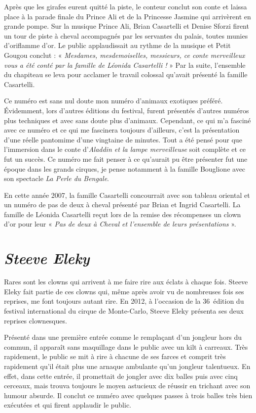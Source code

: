 Après que les girafes eurent quitté la piste, le conteur conclut son conte et laissa place à la parade finale du Prince Ali et de la Princesse Jasmine qui arrivèrent en grande pompe. Sur la musique Prince Ali, Brian Casartelli et Denise Sforzi firent un tour de piste à cheval accompagnés par les servantes du palais, toutes munies d’oriflamme d’or. Le public applaudissait au rythme de la musique et Petit Gougou conclut : « \textit{Mesdames, mesdemoiselles, messieurs, ce conte merveilleux vous a été conté par la famille de Léonida Casartelli ! }» Par la suite, l’ensemble du chapiteau se leva pour acclamer le travail colossal qu'avait présenté la famille Casartelli. 

Ce numéro est sans nul doute mon numéro d’animaux exotiques préféré. Évidemment, lors d’autres éditions du festival, furent présentés d’autres numéros plus techniques et avec sans doute plus d’animaux. Cependant, ce qui m’a fasciné avec ce numéro et ce qui me fascinera toujours d’ailleurs, c'est la présentation d’une réelle pantomime d’une vingtaine de minutes. Tout a été pensé pour que l'immersion dans le conte d’\textit{Aladdin et la lampe merveilleuse} soit complète et ce fut un succès. Ce numéro me fait penser à ce qu’aurait pu être présenter fut une époque dans les grands cirques, je pense notamment à la famille Bouglione avec son spectacle \textit{La Perle du Bengale}. 

En cette année 2007, la famille Casartelli concourrait avec son tableau oriental et un numéro de pas de deux à cheval présenté par Brian et Ingrid Casartelli. La famille de Léonida Casartelli reçut lors de la remise des récompenses un clown d’or pour leur « \textit{Pas de deux à Cheval et l’ensemble de leurs présentations }». 

\section*{\textit{Steeve Eleky}}
{}
\noindent
Rares sont les clowns qui arrivent à me faire rire aux éclats à chaque fois. Steeve Eleky fait partie de ces clowns qui, même après avoir vu de nombreuses fois ses reprises, me font toujours autant rire. En 2012, à l’occasion de la 36\ieme~édition du festival international du cirque de Monte-Carlo, Steeve Eleky présenta ses deux reprises clownesques. 

Présenté dans une première entrée comme le remplaçant d’un jongleur hors du commun, il apparaît sans maquillage dans le public avec un kilt à carreaux. Très rapidement, le public se mit à rire à chacune de ses farces et comprit très rapidement qu’il était plus une arnaque ambulante qu’un jongleur talentueux. En effet, dans cette entrée, il promettait de jongler avec dix balles puis avec cinq cerceaux, mais trouva toujours le moyen astucieux de réussir en trichant avec son humour absurde. Il conclut ce numéro avec quelques passes à trois balles très bien exécutées et qui firent applaudir le public. 


